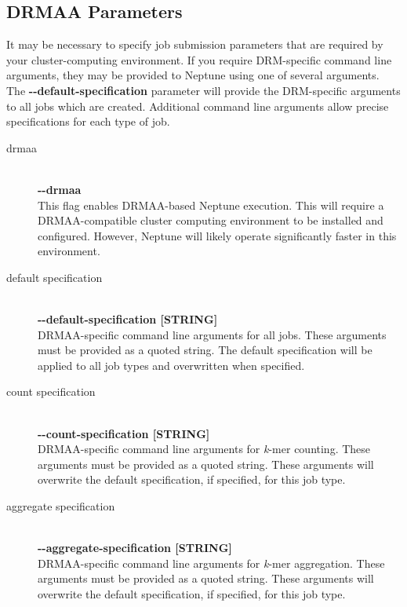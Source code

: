\documentclass[a4paper,10pt]{article}
\begin{document}
\subsection{DRMAA Parameters}

It may be necessary to specify job submission parameters that are required by your cluster-computing environment. If you require DRM-specific command line arguments, they may be provided to Neptune using one of several arguments. The \mbox{\textbf{-{}-default-specification}} parameter will provide the DRM-specific arguments to all jobs which are created. Additional command line arguments allow precise specifications for each type of job.

\begin{description}

  \item[drmaa] \hfill \\
  \textbf{-{}-drmaa} \hfill \\
  This flag enables DRMAA-based Neptune execution. This will require a DRMAA-compatible cluster computing environment to be installed and configured. However, Neptune will likely operate significantly faster in this environment.

  \item[default specification] \hfill \\
  \textbf{-{}-default-specification [STRING]} \hfill \\
  DRMAA-specific command line arguments for all jobs. These arguments must be provided as a quoted string. The default specification will be applied to all job types and overwritten when specified.
  
  \item[count specification] \hfill \\
  \textbf{-{}-count-specification [STRING]} \hfill \\
  DRMAA-specific command line arguments for \textit{k}-mer counting. These arguments must be provided as a quoted string. These arguments will overwrite the default specification, if specified, for this job type.
  
  \item[aggregate specification] \hfill \\
  \textbf{-{}-aggregate-specification [STRING]} \hfill \\
  DRMAA-specific command line arguments for \textit{k}-mer aggregation. These arguments must be provided as a quoted string. These arguments will overwrite the default specification, if specified, for this job type.
  

\end{description}
\end{document}
